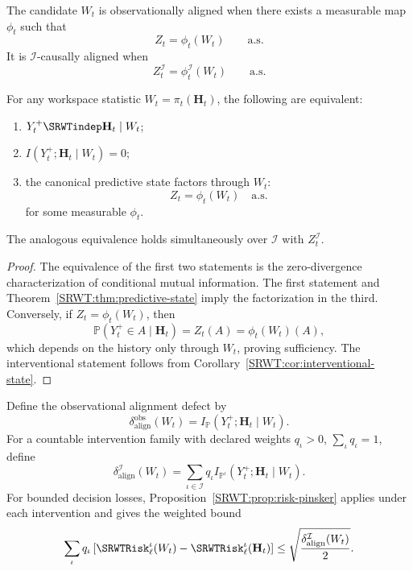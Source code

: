 \begin{SRWTdefinition}
The candidate \(W_t\) is observationally aligned when there exists a measurable
map \(\phi_t\) such that
\[
Z_t=\phi_t(W_t)
\qquad\text{a.s.}
\]
It is \(\mathcal I\)-causally aligned when
\[
Z_t^{\mathcal I}=\phi_t^{\mathcal I}(W_t)
\qquad\text{a.s.}
\]
\end{SRWTdefinition}

\begin{SRWTtheorem}\label{SRWT:thm:alignment-criterion}
For any workspace statistic \(W_t=\pi_t(\mathbf H_t)\), the following are
equivalent:
\begin{enumerate}
\item \(Y_t^+\SRWTindep\mathbf H_t\mid W_t\);
\item \(I(Y_t^+;\mathbf H_t\mid W_t)=0\);
\item the canonical predictive state factors through \(W_t\):
\[
Z_t=\phi_t(W_t)
\quad\text{a.s.}
\]
for some measurable \(\phi_t\).
\end{enumerate}
The analogous equivalence holds simultaneously over \(\mathcal I\) with
\(Z_t^{\mathcal I}\).
\end{SRWTtheorem}

\begin{proof}
The equivalence of the first two statements is the zero-divergence
characterization of conditional mutual information. The first statement and
Theorem~\ref{SRWT:thm:predictive-state} imply the factorization in the third.
Conversely, if \(Z_t=\phi_t(W_t)\), then
\[
\mathbb P(Y_t^+\in A\mid\mathbf H_t)
=Z_t(A)
=\phi_t(W_t)(A),
\]
which depends on the history only through \(W_t\), proving sufficiency. The
interventional statement follows from
Corollary~\ref{SRWT:cor:interventional-state}.
\end{proof}

Define the observational alignment defect by
\[
\boxed{
\delta_{\mathrm{align}}^{\mathrm{obs}}(W_t)
=
I_{\mathbb P}(Y_t^+;\mathbf H_t\mid W_t).
}
\]
For a countable intervention family with declared weights
\(q_\iota>0\), \(\sum_\iota q_\iota=1\), define
\[
\boxed{
\delta_{\mathrm{align}}^{\mathcal I}(W_t)
=
\sum_{\iota\in\mathcal I}
q_\iota
I_{\mathbb P^\iota}
(Y_t^+;\mathbf H_t\mid W_t).
}
\]
For bounded decision losses, Proposition~\ref{SRWT:prop:risk-pinsker} applies under
each intervention and gives the weighted bound
\[
\sum_{\iota}q_\iota
\left[
\SRWTRisk_\ell^{\iota}(W_t)
-
\SRWTRisk_\ell^{\iota}(\mathbf H_t)
\right]
\leq
\sqrt{\frac{
\delta_{\mathrm{align}}^{\mathcal I}(W_t)}{2}}.
\]


